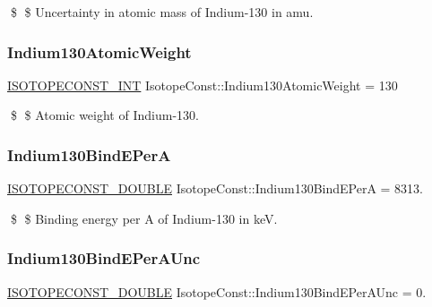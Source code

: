 \$ \$ Uncertainty in atomic mass of Indium-\/130 in amu. \mbox{\label{group___isotope_const-_indium-_in130_ga09380dec37eb27d6da9c971836697b4b}} 
\subsubsection{\texorpdfstring{Indium130\+Atomic\+Weight}{Indium130AtomicWeight}}
{\footnotesize\ttfamily \mbox{\hyperlink{group___isotope_const-_macros_ga5f18360b3e99483a35c32d789e62621c}{I\+S\+O\+T\+O\+P\+E\+C\+O\+N\+S\+T\+\_\+\+I\+NT}} Isotope\+Const\+::\+Indium130\+Atomic\+Weight = 130}

\$ \$ Atomic weight of Indium-\/130. \mbox{\label{group___isotope_const-_indium-_in130_gaf9f53372b5d5f94ee5e1f0b3228eca4a}} 
\subsubsection{\texorpdfstring{Indium130\+Bind\+E\+PerA}{Indium130BindEPerA}}
{\footnotesize\ttfamily \mbox{\hyperlink{group___isotope_const-_macros_ga8f45a7272ce02c0b4c65c44636ed719a}{I\+S\+O\+T\+O\+P\+E\+C\+O\+N\+S\+T\+\_\+\+D\+O\+U\+B\+LE}} Isotope\+Const\+::\+Indium130\+Bind\+E\+PerA = 8313.}

\$ \$ Binding energy per A of Indium-\/130 in keV. \mbox{\label{group___isotope_const-_indium-_in130_ga5ad731e28eb5490277ddbfe7ad2d30c8}} 
\subsubsection{\texorpdfstring{Indium130\+Bind\+E\+Per\+A\+Unc}{Indium130BindEPerAUnc}}
{\footnotesize\ttfamily \mbox{\hyperlink{group___isotope_const-_macros_ga8f45a7272ce02c0b4c65c44636ed719a}{I\+S\+O\+T\+O\+P\+E\+C\+O\+N\+S\+T\+\_\+\+D\+O\+U\+B\+LE}} Isotope\+Const\+::\+Indium130\+Bind\+E\+Per\+A\+Unc = 0.}

